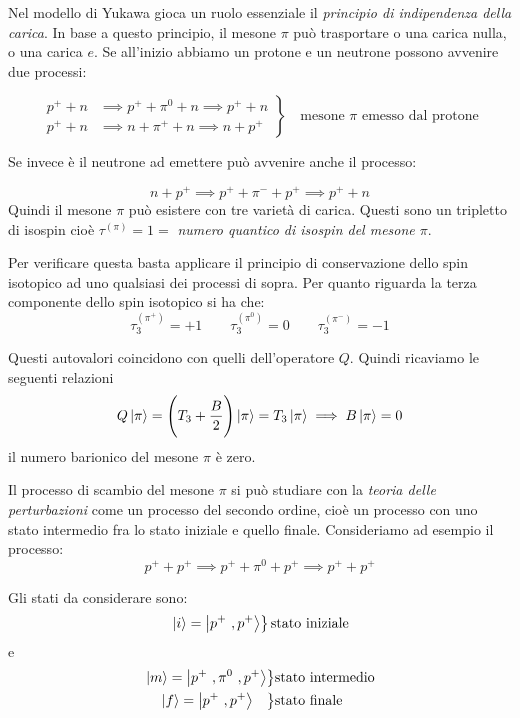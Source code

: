 Nel modello di Yukawa gioca un ruolo essenziale il \textit{principio di 
indipendenza della carica}.
In base a questo principio, il mesone $\pi$ può trasportare o una carica 
nulla, o una carica $e$. 
Se all'inizio abbiamo un protone e un neutrone possono avvenire due processi:

\[
\left.
\begin{aligned}
p^+ + n &\implies p^+ + \pi^0 + n \implies p^+ + n \\
p^+ + n &\implies n + \pi^+ + n \implies n + p^+
\end{aligned}
\right\}
\quad
\text{mesone $\pi$ emesso dal protone}
\]

Se invece è il neutrone ad emettere può avvenire anche il processo:

\begin{equation*}
n + p^+ \implies p^+ + \pi^- + p^+ \implies p^+ + n 
\end{equation*}
Quindi il mesone $\pi$ può esistere con tre varietà di carica. Questi sono un
tripletto di isospin cioè $\tau^{(\pi)} = 1 =$ \textit{numero quantico di 
isospin
del mesone $\pi$}. 

Per verificare questa basta applicare il principio di conservazione dello spin
isotopico ad uno qualsiasi dei processi di sopra. Per quanto riguarda la terza
componente dello spin isotopico si ha che:
\begin{equation*}
  \tau_{3}^{(\pi^+)} = +1 \qquad \tau_{3}^{(\pi^0)} = 0 \qquad 
\tau_{3}^{(\pi^-)} = -1
\end{equation*}

Questi autovalori coincidono con quelli dell'operatore $Q$. Quindi ricaviamo le
seguenti relazioni
\begin{equation*}
Q\Ket{\pi} = \Biggl( T_3 + \dfrac{B}{2} \Biggr) \Ket{\pi} = T_3 \Ket{\pi} 
\implies B \Ket{\pi} = 0
\end{equation*}
il numero barionico del mesone $\pi$ è zero. 

Il processo di scambio del mesone $\pi$ si può studiare con la \textit{teoria
delle perturbazioni} come un processo del secondo ordine, cioè un processo con
uno stato intermedio fra lo stato iniziale e quello finale. Consideriamo ad
esempio il processo:
\begin{equation*}
p^+ + p^+ \implies p^+ + \pi^0 + p^+ \implies p^+ + p^+
\end{equation*}

Gli stati da considerare sono:
\[
\left.
\begin{aligned}
\Ket{i}= \Ket{p^+ \ , p^+}  
\end{aligned}
\right\}
\text{stato iniziale}
\]
e
\[
  \begin{aligned}
  \left. \begin{aligned}
	\Ket{m} = \Ket{p^+ \ , \pi^0 \ , p^+}
  \end{aligned}\right\} &\text{stato intermedio}\\
  \left.\begin{aligned}
    \Ket{f} &= \Ket{p^+ \ , p^+}
  \end{aligned}\right\} &\text{stato finale}
\end{aligned}
\]

